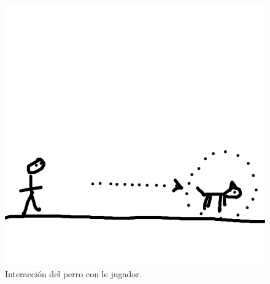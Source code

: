 \documentclass[11pt,letterpaper]{article}
\begin{document}
\begin{itemize}
\begin{figure}
			\includegraphics[height=0.2 \textheight]{Imagenes/proximidadPerro}
			\caption{Interacción del perro con le jugador.}
			\label{fig:proximidadPerro}
		\end{figure}
	\end{itemize}
\end{document}
